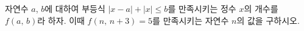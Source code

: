 자연수 $a$, $b$에 대하여 부등식 $|x-a|+|x|\le b$를 만족시키는 정수 $x$의 개수를 $f(a,\,b)$라 하자. 이때 $f(n,\,n+3)=5$를 만족시키는 자연수 $n$의 값을 구하시오.
